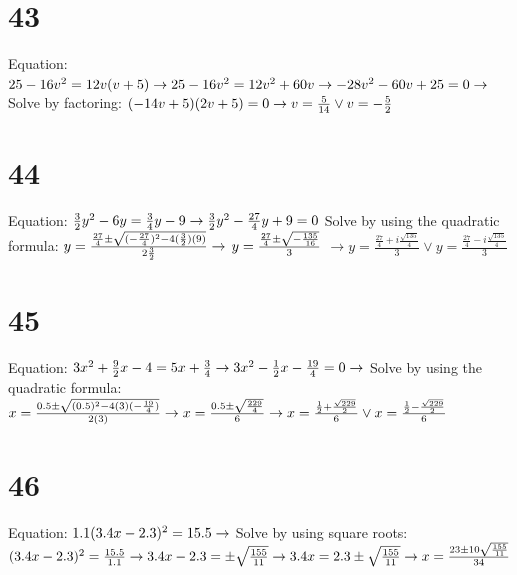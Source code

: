 \documentclass{article}
\theoremstyle{definition}
\begin{document}
\section*{43}
Equation: $25-16v^2=12v(v+5)\newline\rightarrow 25-16v^2=12v^2+60v\newline\rightarrow -28v^2-60v+25=0\newline\rightarrow$ Solve by factoring:\newline 
$(-14v+5)(2v+5)=0\newline\rightarrow v=\frac{5}{14}\vee v=-\frac{5}{2}$

\section*{44}
Equation: $\frac{3}{2}y^2-6y=\frac{3}{4}y-9\newline\rightarrow \frac{3}{2}y^2-\frac{27}{4}y+9=0\newline$ Solve by using the quadratic formula:\newline 
$y=\frac{\frac{27}{4}\pm\sqrt{(-\frac{27}{4})^2-4(\frac{3}{2})(9)}}{2\frac{3}{2}}\newline\rightarrow$
$y=\frac{\frac{27}{4}\pm\sqrt{-\frac{135}{16}}}{3}\newline$
$\rightarrow y=\frac{\frac{27}{4}+i\frac{\sqrt{135}}{4}}{3} \vee y=\frac{\frac{27}{4}-i\frac{\sqrt{135}}{4}}{3}$

\section*{45}
Equation: $3x^2+\frac{9}{2}x-4=5x+\frac{3}{4}\newline\rightarrow 3x^2-\frac{1}{2}x-\frac{19}{4}=0\newline\rightarrow$ Solve by using the quadratic formula:
\newline $x=\frac{0.5\pm\sqrt{(0.5)^2-4(3)(-\frac{19}{4})}}{2(3)}\newline\rightarrow x=\frac{0.5\pm\sqrt{\frac{229}{4}}}{6}\newline\rightarrow
x=\frac{\frac{1}{2}+\frac{\sqrt{229}}{2}}{6}\vee x=\frac{\frac{1}{2}-\frac{\sqrt{229}}{2}}{6}$

\section*{46}
Equation: $1.1(3.4x-2.3)^2=15.5\newline\rightarrow$ Solve by using square roots:\newline $(3.4x-2.3)^2=\frac{15.5}{1.1}\newline\rightarrow
3.4x-2.3=\pm\sqrt{\frac{155}{11}}\newline\rightarrow 3.4x=2.3\pm\sqrt{\frac{155}{11}}\newline\rightarrow x=\frac{23\pm 10\sqrt{\frac{155}{11}
}}{34}$
\end{document}
